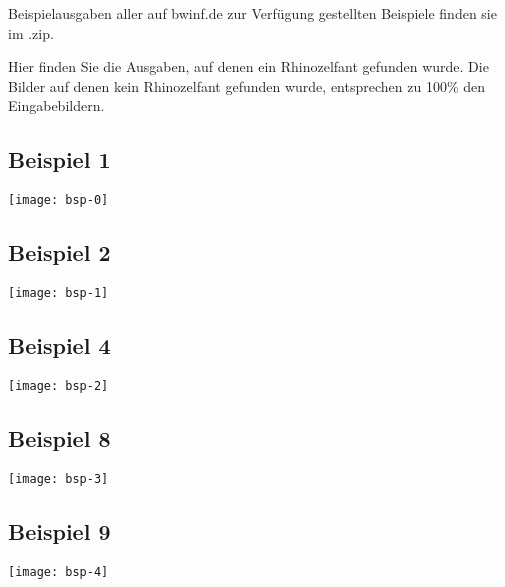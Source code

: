 Beispielausgaben aller auf bwinf.de zur Verfügung gestellten Beispiele finden sie im .zip.

Hier finden Sie die Ausgaben, auf denen ein Rhinozelfant gefunden wurde. Die Bilder auf denen kein Rhinozelfant gefunden wurde, entsprechen zu 100\% den Eingabebildern.

\subsection{Beispiel 1}
	\centering
	\texttt{[image: bsp-0]}
\subsection{Beispiel 2}
	\centering
	\texttt{[image: bsp-1]}
\subsection{Beispiel 4}
	\centering
	\texttt{[image: bsp-2]}
\subsection{Beispiel 8}
	\centering
	\texttt{[image: bsp-3]}
\subsection{Beispiel 9}
	\centering
	\texttt{[image: bsp-4]}
